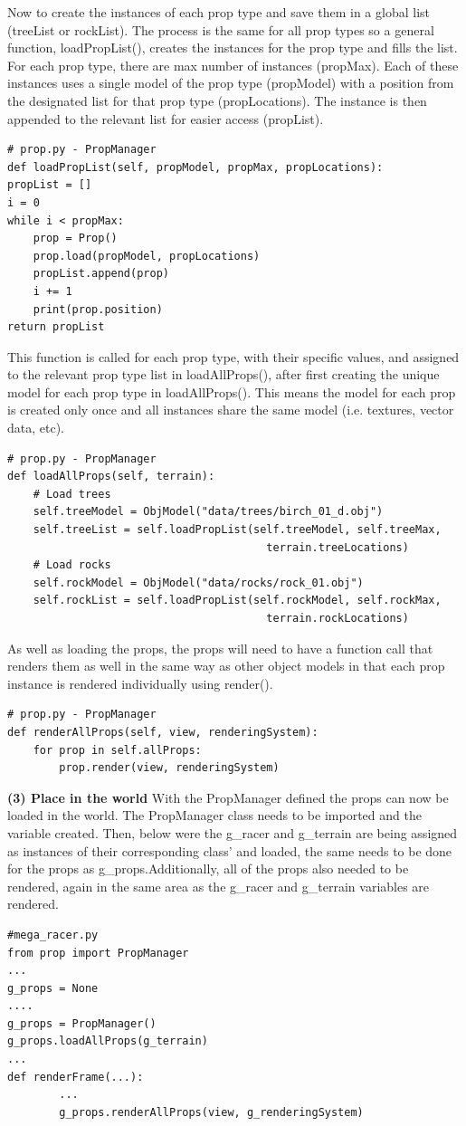 \documentclass[a4 paper, 12pt]{article}
\begin{document}
Now to create the instances of each prop type and save them in a global list (treeList or rockList). The process is the same for all prop types so a general function, loadPropList(), creates the instances for the prop type and fills the list. For each prop type, there are max number of instances (propMax). Each of these instances uses a single model of the prop type (propModel) with a position from the designated list for that prop type (propLocations). The instance is then appended to the relevant list for easier access (propList). 
    \begin{lstlisting}
# prop.py - PropManager
def loadPropList(self, propModel, propMax, propLocations):
propList = []
i = 0
while i < propMax:
    prop = Prop()
    prop.load(propModel, propLocations)
    propList.append(prop)            
    i += 1
    print(prop.position)
return propList
    \end{lstlisting} 

This function is called for each prop type, with their specific values, and assigned to the relevant prop type list in loadAllProps(), after first creating the unique model for each prop type in loadAllProps(). This means the model for each prop is created only once and all instances share the same model (i.e. textures, vector data, etc). 
    \begin{lstlisting}
# prop.py - PropManager 
def loadAllProps(self, terrain): 
    # Load trees
    self.treeModel = ObjModel("data/trees/birch_01_d.obj")
    self.treeList = self.loadPropList(self.treeModel, self.treeMax, 
                                        terrain.treeLocations)
    # Load rocks
    self.rockModel = ObjModel("data/rocks/rock_01.obj")
    self.rockList = self.loadPropList(self.rockModel, self.rockMax, 
                                        terrain.rockLocations)
    \end{lstlisting}

As well as loading the props, the props will need to have a function call that renders them as well in the same way as other object models in that each prop instance is rendered individually using render().
\begin{lstlisting}
# prop.py - PropManager 
def renderAllProps(self, view, renderingSystem):
    for prop in self.allProps:
        prop.render(view, renderingSystem)
\end{lstlisting}

\textbf{(3) Place in the world}
With the PropManager defined the props can now be loaded in the world. The PropManager class needs to be imported and the variable created. Then, below were the g\_racer and g\_terrain are being assigned as instances of their corresponding class' and loaded, the same needs to be done for the props as g\_props.Additionally, all of the props also needed to be rendered, again in the same area as the g\_racer and g\_terrain variables are rendered.
    \begin{lstlisting}
#mega_racer.py
from prop import PropManager
...
g_props = None
....
g_props = PropManager()
g_props.loadAllProps(g_terrain)
...
def renderFrame(...):
        ...
        g_props.renderAllProps(view, g_renderingSystem)
    \end{lstlisting}
\end{document}
